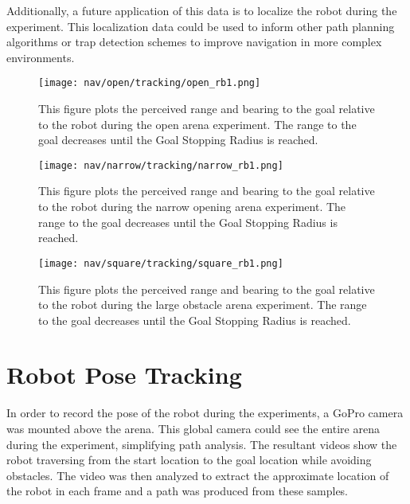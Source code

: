 Additionally, a future application of this data is to localize the robot during the experiment. 
This localization data could be used to inform other path planning algorithms or trap detection schemes to improve navigation in more complex
environments.

\begin{figure}
  \centering
  \texttt{[image: nav/open/tracking/open\_rb1.png]}
  \caption{This figure plots the perceived range and bearing to the goal
           relative to the robot during the open arena experiment. The range
           to the goal decreases until the Goal Stopping Radius is reached.}
  \label{fig:nav_open_rb1}
\end{figure}

\begin{figure}
  \centering
  \texttt{[image: nav/narrow/tracking/narrow\_rb1.png]}
  \caption{This figure plots the perceived range and bearing to the goal
           relative to the robot during the narrow opening arena experiment. The range
           to the goal decreases until the Goal Stopping Radius is reached.}
  \label{fig:nav_narrow_rb1}
\end{figure}

\begin{figure}
  \centering
  \texttt{[image: nav/square/tracking/square\_rb1.png]}
  \caption{This figure plots the perceived range and bearing to the goal
           relative to the robot during the large obstacle arena experiment. The range
           to the goal decreases until the Goal Stopping Radius is reached.}
  \label{fig:nav_square_rb1}
\end{figure}


\FloatBarrier
\section{Robot Pose Tracking} \label{sec:nav_robot_pose_tracking}
In order to record the pose of the robot during the experiments, a GoPro camera
was mounted above the arena. This global camera could see the entire arena during
the experiment, simplifying path analysis. The resultant videos show the robot
traversing from the start location to the goal location while avoiding obstacles.
The video was then analyzed to extract the approximate location of the robot
in each frame and a path was produced from these samples.

